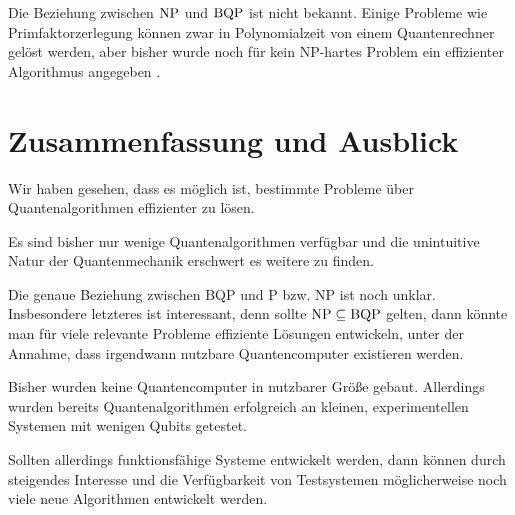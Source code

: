 \documentclass{acm_proc_article-sp}
\begin{document}
Die Beziehung zwischen $\operatorname{NP}$ und $\operatorname{BQP}$ ist nicht bekannt. \linebreak Einige Probleme wie Primfaktorzerlegung
können zwar in Polynomialzeit von einem Quantenrechner gelöst werden,
aber bisher wurde noch für kein NP-hartes Problem ein \linebreak effizienter Algorithmus angegeben \cite{Barenco}.

\section{Zusammenfassung und Ausblick}

Wir haben gesehen, dass es möglich ist, bestimmte Probleme über Quantenalgorithmen effizienter zu lösen.

Es sind bisher nur wenige Quantenalgorithmen verfügbar und die unintuitive Natur der Quantenmechanik
erschwert es weitere zu finden. 

Die genaue Beziehung zwischen BQP und P bzw. NP ist noch unklar. Insbesondere letzteres ist interessant,
denn sollte $\operatorname{NP} \subseteq \operatorname{BQP}$ gelten, dann könnte man für viele relevante Probleme effiziente Lösungen entwickeln,
unter der Annahme, dass irgendwann nutzbare Quantencomputer existieren werden.

Bisher wurden keine Quantencomputer in nutzbarer Größe gebaut. Allerdings wurden bereits Quantenalgorithmen 
erfolgreich an kleinen, experimentellen Systemen mit wenigen Qubits getestet.

Sollten allerdings funktionsfähige Systeme entwickelt werden, dann können durch steigendes 
Interesse und die Verfügbarkeit von Testsystemen möglicherweise noch viele neue Algorithmen entwickelt werden.



\end{document}
